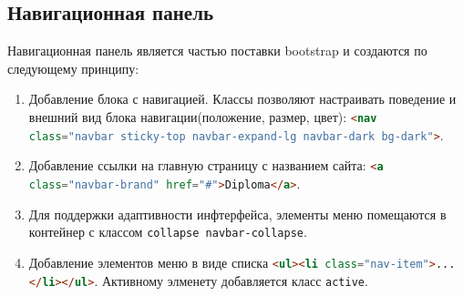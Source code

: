 \subsection{Навигационная панель}
Навигационная панель является частью поставки bootstrap и создаются по следующему принципу:
\begin{enumerate}
	\item Добавление блока с навигацией. Классы позволяют настраивать поведение и внешний вид блока навигации(положение, размер, цвет): \lstinline[language=HTML]{<nav class="navbar sticky-top navbar-expand-lg navbar-dark bg-dark">}.
	\item Добавление ссылки на главную страницу с названием сайта: \lstinline[language=HTML]{<a class="navbar-brand" href="#">Diploma</a>}.
	\item Для поддержки адаптивности инфтерфейса, элементы меню помещаются в контейнер с классом \lstinline[language=HTML]{collapse navbar-collapse}.
	\item Добавление элементов меню в виде списка \lstinline[language=HTML]{<ul><li class="nav-item">...</li></ul>}. Активному элменету добавляется класс \lstinline[language=HTML]{active}.
\end{enumerate}